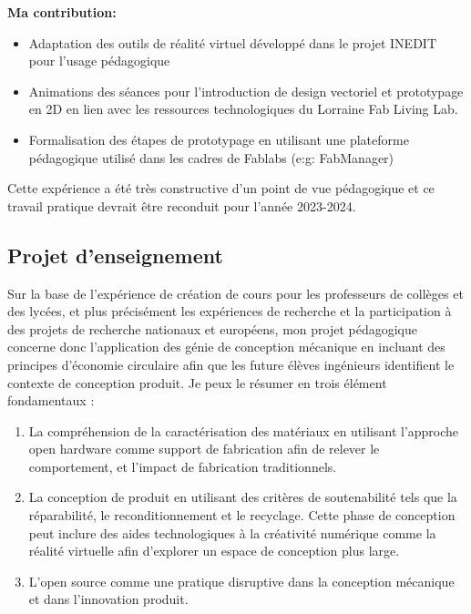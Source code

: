 \documentclass[
  11pt,
]{article}
\providecommand{\tightlist}{%
  \setlength{\itemsep}{0pt}\setlength{\parskip}{0pt}}\usepackage{longtable,booktabs,array}
\begin{document}
\textbf{Ma contribution: }

\begin{itemize}
\tightlist
\item
  Adaptation des outils de réalité virtuel développé dans le projet
  INEDIT pour l'usage pédagogique
\item
  Animations des séances pour l'introduction de design vectoriel et
  prototypage en 2D en lien avec les ressources technologiques du
  Lorraine Fab Living Lab.
\item
  Formalisation des étapes de prototypage en utilisant une plateforme
  pédagogique utilisé dans les cadres de Fablabs (e:g: FabManager)
\end{itemize}

Cette expérience a été très constructive d'un point de vue pédagogique
et ce travail pratique devrait être reconduit pour l'année 2023-2024.

\hypertarget{projet-denseignement}{%
\subsection{Projet d'enseignement}\label{projet-denseignement}}

Sur la base de l'expérience de création de cours pour les professeurs de
collèges et des lycées, et plus précisément les expériences de recherche
et la participation à des projets de recherche nationaux et européens,
mon projet pédagogique concerne donc l'application des génie de
conception mécanique en incluant des principes d'économie circulaire
afin que les future élèves ingénieurs identifient le contexte de
conception produit. Je peux le résumer en trois élément fondamentaux :

\begin{enumerate}
\def\labelenumi{\arabic{enumi}.}
\tightlist
\item
  La compréhension de la caractérisation des matériaux en utilisant
  l'approche open hardware comme support de fabrication afin de relever
  le comportement, et l'impact de fabrication traditionnels.
\item
  La conception de produit en utilisant des critères de soutenabilité
  tels que la réparabilité, le reconditionnement et le recyclage. Cette
  phase de conception peut inclure des aides technologiques à la
  créativité numérique comme la réalité virtuelle afin d'explorer un
  espace de conception plus large.
\item
  L'open source comme une pratique disruptive dans la conception
  mécanique et dans l'innovation produit.
\end{enumerate}
\end{document}
